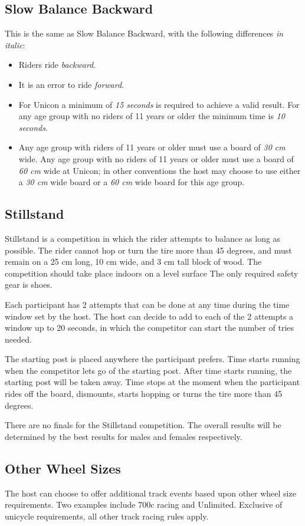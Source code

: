 \subsection{Slow Balance Backward}
This is the same as Slow Balance Backward, with the following differences \textit {in italic}:
\begin{itemize}
\item Riders ride \textit{backward}.
\item It is an error to ride \textit{forward}.
\item For Unicon a minimum of \textit{15 seconds} is required to achieve a valid result.
For any age group with no riders of 11 years or older the minimum time is \textit{10 seconds}.
\item Any age group with riders of 11 years or older must use a board of \textit{30 cm} wide.
Any age group with no riders of 11 years or older must use a board of \textit{60 cm} wide at Unicon; in other conventions the host may choose to use either a \textit{30 cm} wide board or a \textit{60 cm} wide board for this age group.
\end{itemize}

\subsection{Stillstand}
Stillstand is a competition in which the rider attempts to balance as long as possible.
The rider cannot hop or turn the tire more than 45 degrees, and must remain on a 25 cm long, 10 cm wide, and 3 cm tall block of wood.
The competition should take place indoors on a level surface
The only required safety gear is shoes.

Each participant has 2 attempts that can be done at any time during the time window set by the host.
The host can decide to add to each of the 2 attempts a window up to 20 seconds, in which the competitor can start the number of tries needed.

The starting post is placed anywhere the participant prefers.
Time starts running when the competitor lets go of the starting post.
After time starts running, the starting post will be taken away.
Time stops at the moment when the participant rides off the board, dismounts, starts hopping or turns the tire more than 45 degrees.

There are no finals for the Stillstand competition.
The overall results will be determined by the best results for males and females respectively.

\subsection{Other Wheel Sizes}
The host can choose to offer additional track events based upon other wheel size requirements.
Two examples include 700c racing and Unlimited.
Exclusive of unicycle requirements, all other track racing rules apply.

